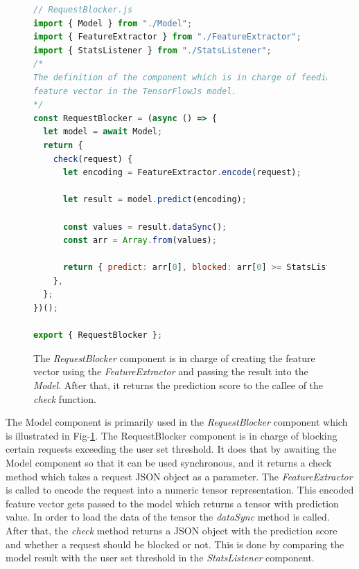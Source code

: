 \begin{figure}[ht!]
  \begin{lstlisting}[language=JavaScript]
// RequestBlocker.js
import { Model } from "./Model";
import { FeatureExtractor } from "./FeatureExtractor";
import { StatsListener } from "./StatsListener";
/*
The definition of the component which is in charge of feeding the
feature vector in the TensorFlowJs model.
*/
const RequestBlocker = (async () => {
  let model = await Model;
  return {
    check(request) {
      let encoding = FeatureExtractor.encode(request);

      let result = model.predict(encoding);

      const values = result.dataSync();
      const arr = Array.from(values);

      return { predict: arr[0], blocked: arr[0] >= StatsListener.getRate() };
    },
  };
})();

export { RequestBlocker };
\end{lstlisting}
\caption{The \emph{RequestBlocker} component is in charge of creating the feature vector using the \emph{FeatureExtractor} and passing the 
result into the \emph{Model}. After that, it returns the prediction score to the callee of the \emph{check} function.}
\label{fig:blocker}
\end{figure}
The Model component is primarily used in the \emph{RequestBlocker} component which is illustrated in Fig-\ref{fig:blocker}. The RequestBlocker
component is in charge of blocking certain requests exceeding the user set threshold. It does that by awaiting the Model component so that 
it can be used synchronous, and it returns a check method which takes a request JSON object as a parameter. The \emph{FeatureExtractor}
is called to encode the request into a numeric tensor representation. This encoded feature vector gets passed to the model which returns
a tensor with prediction value. In order to load the data of the tensor the \emph{dataSync} method is called. After that, the \emph{check}
method returns a JSON object with the prediction score and whether a request should be blocked or not. This is done by comparing the model result
with the user set threshold in the \emph{StatsListener} component.
